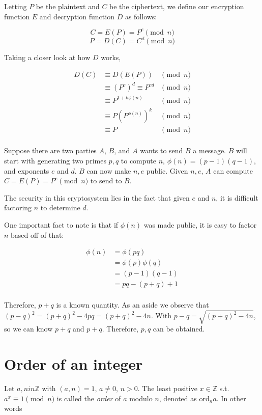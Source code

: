 \documentclass{article}
\begin{document}
\begin{multicols*}{2}
Letting $P$ be the plaintext and $C$ be the ciphertext, we define our encryption function $E$ and decryption function $D$ as follows:

\[ C = E(P) = P^e \pmod{n} \]
\[ P = D(C) = C^d \pmod{n} \]

Taking a closer look at how $D$ works,

\[
\begin{aligned}
D(C) &\equiv D(E(P)) &\pmod{n} \\
&\equiv (P^e)^d \equiv P^{ed} &\pmod{n}\\
&\equiv P^{1 + k\phi(n)} &\pmod{n}\\
&\equiv P(P^{\phi(n)})^k &\pmod{n}\\
&\equiv P &\pmod{n}\\
\end{aligned}
\]

Suppose there are two parties $A$, $B$, and $A$ wants to send $B$ a message. $B$ will start with generating two primes $p, q$ to compute $n$, $\phi(n) = (p-1)(q-1)$, and exponents $e$ and $d$. $B$ can now make $n, e$ public. Given $n, e$, $A$ can compute $C = E(P) = P^e \pmod{n}$ to send to $B$.

The security in this cryptosystem lies in the fact that given $e$ and $n$, it is difficult factoring $n$ to determine $d$.

One important fact to note is that if $\phi(n)$ was made public, it is easy to factor $n$ based off of that:

\[
\begin{aligned}
\phi(n) &= \phi(pq) \\
&= \phi(p)\phi(q) \\
&= (p-1)(q-1) \\
&= pq - (p+q) + 1 \\
\end{aligned}
\]

Therefore, $p+q$ is a known quantity. As an aside we observe that $(p-q)^2 = (p+q)^2 - 4pq = (p+q)^2 - 4n$. With $p - q = \sqrt{(p+q)^2 - 4n}$, so we can know $p + q$ and $p + q$. Therefore, $p, q$ can be obtained.

\section{Order of an integer}

Let $a, n in \mathbb{Z}$ with $(a,n) = 1$, $a \neq 0$, $n > 0$. The least positive $x \in \mathbb{Z}$ s.t. $a^x \equiv 1 \pmod{n}$ is called the \textit{order} of $a$ modulo $n$, denoted as $\text{ord}_na$. In other words


\end{multicols*}
\end{document}
